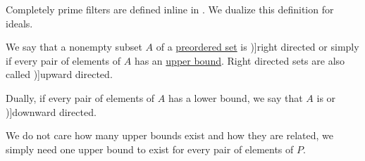 \begin{comments}
  \item Completely prime filters are defined inline in \cite[41]{Johnstone1982StoneSpaces}. We dualize this definition for ideals.
\end{comments}

\begin{definition}\label{def:directed_set}
  We say that a nonempty subset \( A \) of a \hyperref[def:preordered_set]{preordered set} is \term[bg=насочено надясно (множество) (\cite[10]{Проданов1982ФункционаленАнализЧаст1})]{right directed} or simply  if every pair of elements of \( A \) has an \hyperref[def:extremal_points/bounds]{upper bound}. Right directed sets are also called \term[en=upward directed (\cite[25]{Johnstone1982StoneSpaces})]{upward directed}.

  Dually, if every pair of elements of \( A \) has a lower bound, we say that \( A \) is  or \term[en=downward directed (\cite[167]{Perrone2024StartingCategoryTheory})]{downward directed}.
\end{definition}
\begin{comments}
  \item We do not care how many upper bounds exist and how they are related, we simply need one upper bound to exist for every pair of elements of \( P \).
\end{comments}

